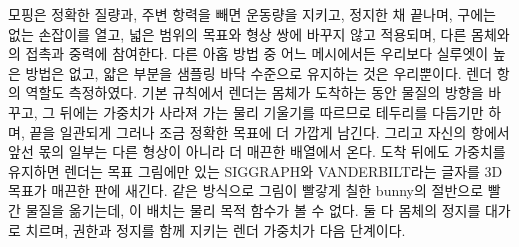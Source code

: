 모핑은 정확한 질량과, 주변 항력을 빼면 운동량을 지키고, 정지한 채 끝나며, 구에는 없는 손잡이를 열고, 넓은 범위의 목표와 형상
쌍에 바꾸지 않고 적용되며, 다른 몸체와의 접촉과 중력에 참여한다. 다른 아홉 방법 중 어느 메시에서든 우리보다 실루엣이 높은
방법은 없고, 얇은 부분을 샘플링 바닥 수준으로 유지하는 것은 우리뿐이다. 렌더 항의 역할도 측정하였다. 기본 규칙에서 렌더는 몸체가 도착하는
동안 물질의 방향을 바꾸고, 그 뒤에는 가중치가 사라져 가는 물리 기울기를 따르므로 테두리를 다듬기만 하며, 끝을 일관되게 그러나
조금 정확한 목표에 더 가깝게 남긴다. 그리고 자신의 항에서 앞선 몫의 일부는 다른 형상이 아니라 더 매끈한 배열에서 온다.
도착 뒤에도 가중치를 유지하면 렌더는 목표 그림에만 있는 SIGGRAPH와 VANDERBILT라는 글자를 3D 목표가 매끈한 판에 새긴다.
같은 방식으로 그림이 빨갛게 칠한 bunny의 절반으로 빨간 물질을 옮기는데, 이 배치는 물리 목적 함수가 볼 수 없다. 둘 다 몸체의
정지를 대가로 치르며, 권한과 정지를 함께 지키는 렌더 가중치가 다음 단계이다.
